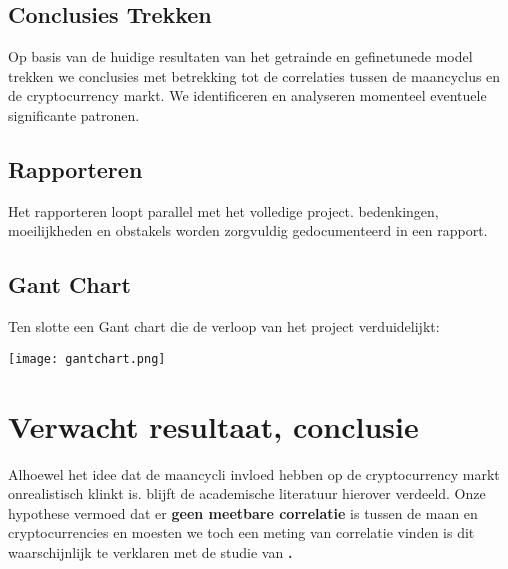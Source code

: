 \documentclass{hogent-article}
\begin{document}
\subsection{Conclusies Trekken}
Op basis van de huidige resultaten van het getrainde en gefinetunede model trekken we conclusies met betrekking tot de correlaties tussen de maancyclus en de cryptocurrency markt. We identificeren en analyseren momenteel eventuele significante patronen.

\subsection{Rapporteren}
Het rapporteren loopt parallel met het volledige project. bedenkingen, moeilijkheden en obstakels worden zorgvuldig gedocumenteerd in een rapport.

\subsection{Gant Chart}
Ten slotte een Gant chart die de verloop van het project verduidelijkt:

\texttt{[image: gantchart.png]}

\section{Verwacht resultaat, conclusie}%
\label{sec:Resultaat-en-conclusie}
Alhoewel het idee dat de maancycli invloed hebben op de cryptocurrency markt onrealistisch klinkt is. blijft de academische literatuur hierover verdeeld. Onze hypothese vermoed dat er \textbf{geen meetbare correlatie} is tussen de maan en cryptocurrencies en moesten we toch een meting van correlatie vinden is dit waarschijnlijk te verklaren met de studie van \textbf{\textcite{Brahmana2014}.}

\pagebreak[2]
\printbibliography[heading=bibintoc]
\end{document}
